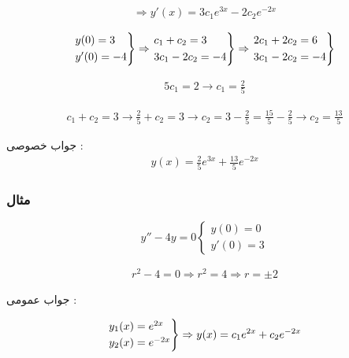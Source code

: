 \documentclass[12pt]{book}
\begin{document}
\begin{align*}
\Rightarrow y'(x) = 3c_{1}e^{3x} - 2 c_{2}e^{-2x}
\end{align*}

\begin{align*}
\begin{rcases}
y(0) = 3 \\
y'(0) = -4 
\end{rcases}
\Rightarrow 
\begin{rcases}
c_{1} + c_{2} = 3 \\
3c_{1} - 2c_{2} = -4 
\end{rcases}
\Rightarrow
\begin{rcases}
2c_{1} + 2c_{2} = 6 \\
3c_{1} - 2c_{2} = -4 
\end{rcases}
\end{align*}

\begin{align*}
5c_{1} = 2 \to c_{1} = \frac{2}{5}
\end{align*}

\begin{align*}
c_{1} + c_{2} = 3 \to \frac{2}{5} + c_{2} = 3 \to c_{2} = 3 - \frac{2}{5} = \frac{15}{5} - \frac{2}{5} \to c_{2} = \frac{13}{5}
\end{align*}


جواب خصوصی : 
\begin{align*}
y(x) = \frac{2}{5} e^{3x} + \frac{13}{5} e^{-2x}
\end{align*}


\subsubsection{مثال}

$$
y'' - 4y = 0 \begin{cases} y(0) = 0 \\ y'(0) = 3 \end{cases}
$$

\begin{align*}
r^{2} - 4 = 0 \Rightarrow r^{2} = 4 \Rightarrow r = \pm 2
\end{align*}

جواب عمومی :

\begin{align*}
\begin{rcases}
y_{1}(x) = e^{2x} \\
y_{2}(x) = e^{-2x}
\end{rcases}
\Rightarrow 
y(x) = c_{1}e^{2x} + c_{2}e^{-2x}
\end{align*}
\end{document}
